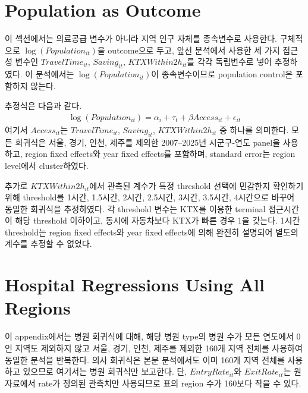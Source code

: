 \documentclass[a4paper, 10pt]{article}
\begin{document}
    \section{Population as Outcome}
        이 섹션에서는 의료공급 변수가 아니라 지역 인구 자체를 종속변수로 사용한다.
        구체적으로 $\log(Population_{it})$을 outcome으로 두고, 앞선 분석에서 사용한
        세 가지 접근성 변수인 $TravelTime_{it}$, $Saving_{it}$,
        $KTXWithin2h_{it}$를 각각 독립변수로 넣어 추정하였다. 이 분석에서는
        $\log(Population_{it})$이 종속변수이므로 population control은 포함하지 않는다.

        추정식은 다음과 같다.
        \begin{align*}
            \log(Population_{it})
            =
            \alpha_i + \tau_t
            + \beta Access_{it}
            + \epsilon_{it}
        \end{align*}
        여기서 $Access_{it}$는 $TravelTime_{it}$, $Saving_{it}$,
        $KTXWithin2h_{it}$ 중 하나를 의미한다. 모든 회귀식은 서울, 경기, 인천, 제주를
        제외한 2007--2025년 시군구-연도 panel을 사용하고, region fixed effects와
        year fixed effects를 포함하며, standard error는 region level에서 cluster하였다.

        \begin{table}[H]
            \centering
            \caption{Population as Outcome}
            
        \end{table}

        추가로 $KTXWithin2h_{it}$에서 관측된 계수가 특정 threshold 선택에 민감한지 확인하기
        위해 threshold를 1시간, 1.5시간, 2시간, 2.5시간, 3시간, 3.5시간, 4시간으로
        바꾸어 동일한 회귀식을 추정하였다. 각 threshold 변수는 KTX를 이용한 terminal
        접근시간이 해당 threshold 이하이고, 동시에 자동차보다 KTX가 빠른 경우 1을 갖는다.
        1시간 threshold는 region fixed effects와 year fixed effects에 의해 완전히 설명되어
        별도의 계수를 추정할 수 없었다.

        \begin{table}[H]
            \centering
            \caption{Population as Outcome, KTX Within Threshold Robustness}
            
        \end{table}

    \appendix

    \section{Hospital Regressions Using All Regions}
        이 appendix에서는 병원 회귀식에 대해, 해당 병원 type의 병원 수가 모든 연도에서 0인
        지역도 제외하지 않고 서울, 경기, 인천, 제주를 제외한 160개 지역 전체를 사용하여
        동일한 분석을 반복한다. 의사 회귀식은 본문 분석에서도 이미 160개 지역 전체를 사용하고
        있으므로 여기서는 병원 회귀식만 보고한다. 단, $EntryRate_{it}$와 $ExitRate_{it}$는
        원자료에서 rate가 정의된 관측치만 사용되므로 표의 region 수가 160보다 작을 수 있다.
\end{document}
